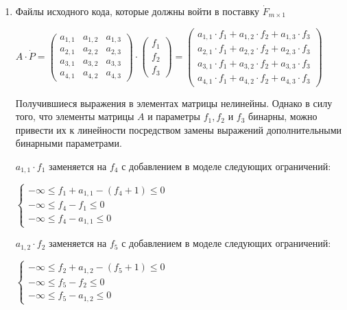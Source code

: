 \begin{enumerate}
  \item Файлы исходного кода, которые должны войти в поставку $\dot{F}_{m \times 1}$
  \begin{center}
    $
    A \cdot \dot{P} =
    \begin{pmatrix}
      a_{1, 1} & a_{1, 2} & a_{1, 3} \\
      a_{2, 1} & a_{2, 2} & a_{2, 3} \\
      a_{3, 1} & a_{3, 2} & a_{3, 3} \\
      a_{4, 1} & a_{4, 2} & a_{4, 3}
    \end{pmatrix}
    \cdot
    \begin{pmatrix}
      f_{1} \\ 
      f_{2} \\
      f_{3} 
    \end{pmatrix}
    =
    \begin{pmatrix}
      a_{1, 1} \cdot f_{1} + a_{1, 2} \cdot f_{2} + a_{1, 3} \cdot f_{3} \\ 
      a_{2, 1} \cdot f_{1} + a_{2, 2} \cdot f_{2} + a_{2, 3} \cdot f_{3} \\
      a_{3, 1} \cdot f_{1} + a_{3, 2} \cdot f_{2} + a_{3, 3} \cdot f_{3} \\ 
      a_{4, 1} \cdot f_{1} + a_{4, 2} \cdot f_{2} + a_{4, 3} \cdot f_{3} 
    \end{pmatrix}
    $
  \end{center}

  Получившиеся выражения в элементах матрицы нелинейны. Однако в силу того, что элементы матрицы $A$ и параметры $f_{1}, f_{2}$ и $f_{3}$ бинарны, можно привести их к линейности посредством замены выражений дополнительными бинарными параметрами.
  
  $a_{1, 1} \cdot f_{1}$ заменяется на $f_{4}$ с добавлением в моделе следующих ограничений:
  \begin{center}
    $
      \begin{cases}
        -\infty \le f_{1} + a_{1,1} - (f_{4} + 1) \le 0 \\ %
        -\infty \le f_{4} - f_{1} \le 0 \\ %
        -\infty \le f_{4} - a_{1,1} \le 0 %
      \end{cases}
    $
  \end{center}

  $a_{1, 2} \cdot f_{2}$ заменяется на $f_{5}$ с добавлением в моделе следующих ограничений:
  \begin{center}
    $
      \begin{cases}
        -\infty \le f_{2} + a_{1,2} - (f_{5} + 1) \le 0 \\ %
        -\infty \le f_{5} - f_{2} \le 0 \\ %
        -\infty \le f_{5} - a_{1,2} \le 0 %
      \end{cases}
    $
  \end{center}


\end{enumerate}
